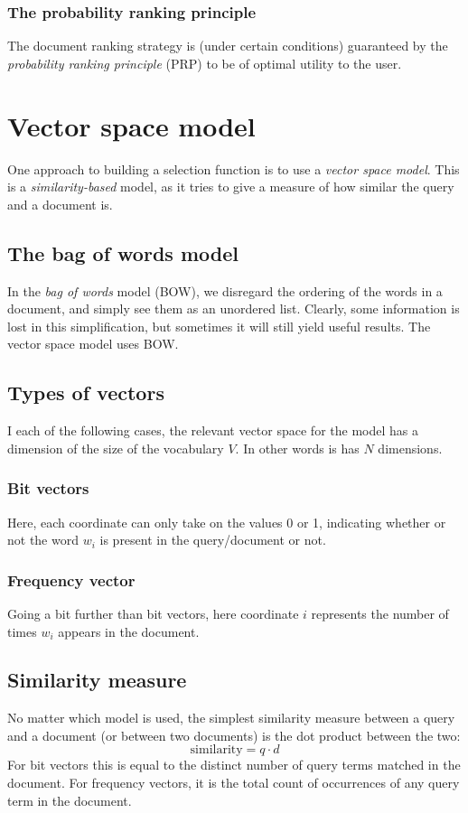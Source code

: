 \documentclass[12pt, a4paper]{article}
\numberwithin{equation}{section}
\begin{document}
\subsubsection{The probability ranking principle}
The document ranking strategy is (under certain conditions) guaranteed by the \textit{probability ranking principle} (PRP) to be of optimal utility to the user.

\section{Vector space model}
One approach to building a selection function is to use a \textit{vector space model}. This is a \textit{similarity-based} model, as it tries to give a measure of how similar the query and a document is.

\subsection{The bag of words model}
In the \textit{bag of words} model (BOW), we disregard the ordering of the words in a document, and simply see them as an unordered list. Clearly, some information is lost in this simplification, but sometimes it will still yield useful results. The vector space model uses BOW.

\subsection{Types of vectors}
I each of the following cases, the relevant vector space for the model has a dimension of the size of the vocabulary $V$. In other words is has $N$ dimensions.

\subsubsection{Bit vectors}
Here, each coordinate can only take on the values 0 or 1, indicating whether or not the word $w_i$ is present in the query/document or not.

\subsubsection{Frequency vector}
Going a bit further than bit vectors, here coordinate $i$ represents the number of times $w_i$ appears in the document.

\subsection{Similarity measure}
No matter which model is used, the simplest similarity measure between a query and a document (or between two documents) is the dot product between the two:
\begin{equation}
\textrm{similarity}=q\cdot d
\end{equation}
For bit vectors this is equal to the distinct number of query terms matched in the document. For frequency vectors, it is the total count of occurrences of any query term in the document.
\end{document}
